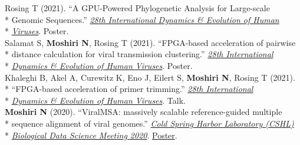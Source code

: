\documentclass[margin,line]{res}
\begin{document}
\begin{resume}
\hspace*{9mm}  Rosing T (2021). ``A GPU-Powered Phylogenetic Analysis for Large-scale\\*
\hspace*{9.5mm} Genomic Sequences.'' \href{https://cpd.ucsd.edu/hivdynamics/}{\textit{28th International Dynamics \& Evolution of Human}}\\*\vspace{2mm}
\hspace*{7.5mm} \href{https://cpd.ucsd.edu/hivdynamics/}{\textit{Viruses}}. Poster.\\
\hspace*{4mm} Salamat S, \textbf{Moshiri N}, Rosing T (2021). ``FPGA-based acceleration of pairwise\\*
\hspace*{9mm} distance calculation for viral transmission clustering.'' \href{https://cpd.ucsd.edu/hivdynamics/}{\textit{28th International}}\\*\vspace{2mm}
\hspace*{8mm} \href{https://cpd.ucsd.edu/hivdynamics/}{\textit{Dynamics \& Evolution of Human Viruses}}. Poster.\\
\hspace*{4mm} Khaleghi B, Akel A, Curewitz K, Eno J, Eilert S, \textbf{Moshiri N}, Rosing T (2021).\\*
\hspace*{9mm} ``FPGA-based acceleration of primer trimming.'' \href{https://cpd.ucsd.edu/hivdynamics/}{\textit{28th International}}\\*\vspace{2mm}
\hspace*{8mm} \href{https://cpd.ucsd.edu/hivdynamics/}{\textit{Dynamics \& Evolution of Human Viruses}}. Talk.\\
\hspace*{4mm} \textbf{Moshiri N} (2020). ``ViralMSA: massively scalable reference-guided multiple\\*
\hspace*{9mm} sequence alignment of viral genomes.'' \href{http://meetings.cshl.edu/meetings.aspx?meet=DATA&year=20}{\textit{Cold Spring Harbor Laboratory (CSHL)}}\\*\vspace{2mm}
\hspace*{8mm} \href{http://meetings.cshl.edu/meetings.aspx?meet=DATA&year=18}{\textit{Biological Data Science Meeting 2020}}. \href{https://meetings.cshl.edu/posters/data20/data2020_AbstractBookVirtual.pdf}{Poster}.\\

\end{resume}
\end{document}
